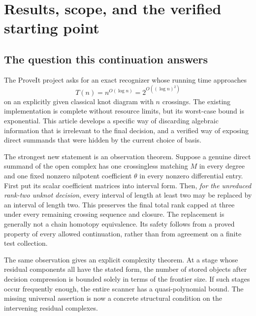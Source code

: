\section{Results, scope, and the verified starting point}
\label{sec:scope}

\subsection{The question this continuation answers}
The ProveIt project asks for an exact recognizer whose running time approaches
\begin{equation}\label{eq:target}
 T(n)=n^{O(\log n)}=2^{O((\log n)^2)}
\end{equation}
on an explicitly given classical knot diagram with $n$ crossings. The existing
implementation is complete without resource limits, but its worst-case bound
is exponential. This article develops a specific way of discarding algebraic
information that is irrelevant to the final decision, and a verified way of
exposing direct summands that were hidden by the current choice of basis.

The strongest new statement is an observation theorem. Suppose a genuine
direct summand of the open complex has one crossingless matching $M$ in every
degree and one fixed nonzero nilpotent coefficient $\theta$ in every nonzero
differential entry. First put its scalar coefficient matrices into interval
form. Then, \emph{for the unreduced rank-two unknot decision}, every interval
of length at least two may be replaced by an interval of length two. This
preserves the final total rank capped at three under every remaining crossing
sequence and closure. The replacement is generally not a chain homotopy
equivalence. Its safety follows from a proved property of every allowed
continuation, rather than from agreement on a finite test collection.

The same observation gives an explicit complexity theorem. At a stage whose
residual components all have the stated form, the number of stored objects
after decision compression is bounded solely in terms of the frontier size.
If such stages occur frequently enough, the entire scanner has a
quasi-polynomial bound. The missing universal assertion is now a concrete
structural condition on the intervening residual complexes.

